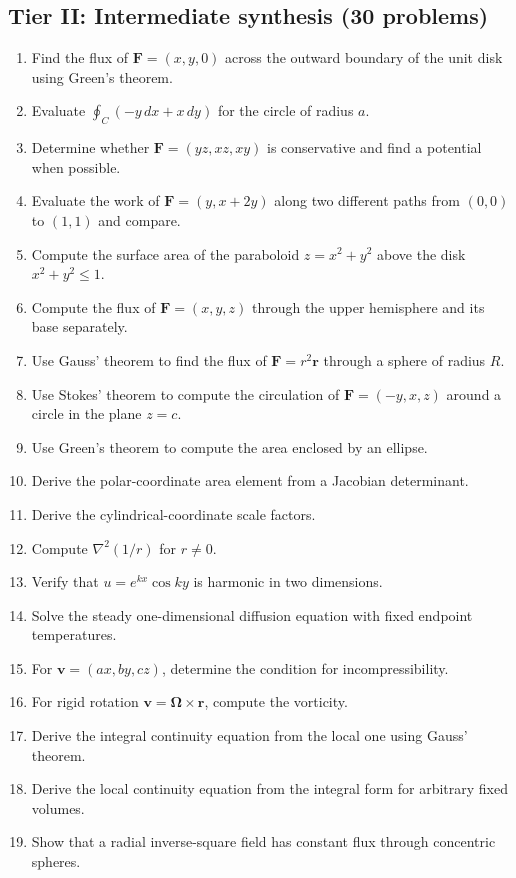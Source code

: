 \subsection*{Tier II: Intermediate synthesis (30 problems)}
\begin{enumerate}[label=\textbf{\arabic*.},leftmargin=*]
\item Find the flux of $\mathbf F=(x,y,0)$ across the outward boundary of the unit disk using Green's theorem.
\item Evaluate $\oint_C(-y\,dx+x\,dy)$ for the circle of radius $a$.
\item Determine whether $\mathbf F=(yz,xz,xy)$ is conservative and find a potential when possible.
\item Evaluate the work of $\mathbf F=(y,x+2y)$ along two different paths from $(0,0)$ to $(1,1)$ and compare.
\item Compute the surface area of the paraboloid $z=x^2+y^2$ above the disk $x^2+y^2\le 1$.
\item Compute the flux of $\mathbf F=(x,y,z)$ through the upper hemisphere and its base separately.
\item Use Gauss' theorem to find the flux of $\mathbf F=r^2\mathbf r$ through a sphere of radius $R$.
\item Use Stokes' theorem to compute the circulation of $\mathbf F=(-y,x,z)$ around a circle in the plane $z=c$.
\item Use Green's theorem to compute the area enclosed by an ellipse.
\item Derive the polar-coordinate area element from a Jacobian determinant.
\item Derive the cylindrical-coordinate scale factors.
\item Compute $\nabla^2(1/r)$ for $r\ne0$.
\item Verify that $u=e^{kx}\cos ky$ is harmonic in two dimensions.
\item Solve the steady one-dimensional diffusion equation with fixed endpoint temperatures.
\item For $\mathbf v=(ax,by,cz)$, determine the condition for incompressibility.
\item For rigid rotation $\mathbf v=\boldsymbol\Omega\times\mathbf r$, compute the vorticity.
\item Derive the integral continuity equation from the local one using Gauss' theorem.
\item Derive the local continuity equation from the integral form for arbitrary fixed volumes.
\item Show that a radial inverse-square field has constant flux through concentric spheres.

\end{enumerate}
